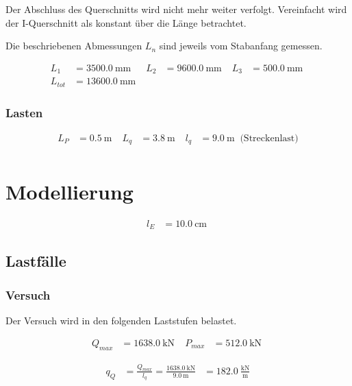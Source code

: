 \documentclass[
  11pt,
  letterpaper,
]{scrreprt}
\begin{document}
Der Abschluss des Querschnitts wird nicht mehr weiter verfolgt.
Vereinfacht wird der I-Querschnitt als konstant über die Länge
betrachtet.

Die beschriebenen Abmessungen \(L_n\) sind jeweils vom Stabanfang
gemessen.

$$
\begin{aligned}
L_{1} &= 3500.0\ \mathrm{mm} \; 
 &L_{2} &= 9600.0\ \mathrm{mm} \; 
 &L_{3} &= 500.0\ \mathrm{mm} \; 
\\[10pt]
 L_{tot} &= 13600.0\ \mathrm{mm} \;
\end{aligned}
$$

\subsubsection{Lasten}\label{lasten}

$$
\begin{aligned}
L_{P} &= 0.5\ \mathrm{m} \; 
 &L_{q} &= 3.8\ \mathrm{m} \; 
 &l_{q} &= 9.0\ \mathrm{m} \; \;\textrm{(Streckenlast)}
\\[10pt]
\end{aligned}
$$

\section{Modellierung}\label{modellierung-1}

$$
\begin{aligned}
l_{E} &= 10.0\ \mathrm{cm} \;
\end{aligned}
$$

\subsection{Lastfälle}\label{lastfuxe4lle}

\subsubsection{Versuch}\label{versuch}

Der Versuch wird in den folgenden Laststufen belastet.

$$
\begin{aligned}
Q_{max} &= 1638.0\ \mathrm{kN} \; 
 &P_{max} &= 512.0\ \mathrm{kN} \;
\end{aligned}
$$

$$
\begin{aligned}
q_{Q} &= \frac{ Q_{max} }{ l_{q} }  = \frac{ 1638.0\ \mathrm{kN} }{ 9.0\ \mathrm{m} } &= 182.0\ \frac{\mathrm{kN}}{\mathrm{m}}  
\end{aligned}
$$
\end{document}

